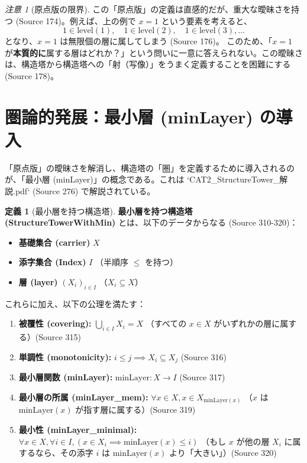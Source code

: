 \documentclass[11pt]{ltjsarticle}
\theoremstyle{definition}
\newtheorem{definition}{定義}[section]
\theoremstyle{plain}
\theoremstyle{remark}
\newtheorem{remark}{注意}[section]
\begin{document}
\begin{remark}[原点版の限界]
この「原点版」の定義は直感的だが、重大な曖昧さを持つ (Source 174)。例えば、上の例で $x = 1$ という要素を考えると、
$$ 1 \in \text{level}(1), \quad 1 \in \text{level}(2), \quad 1 \in \text{level}(3), \dots $$
となり、$x=1$ は無限個の層に属してしまう (Source 176)。
このため、「$x=1$ が\textbf{本質的に}属する層はどれか？」という問いに一意に答えられない。この曖昧さは、構造塔から構造塔への「射（写像）」をうまく定義することを困難にする (Source 178)。
\end{remark}

\section{圏論的発展：最小層 (minLayer) の導入}

「原点版」の曖昧さを解消し、構造塔の「圏」を定義するために導入されるのが、「最小層 (minLayer)」の概念である。これは `CAT2_StructureTower_解説.pdf` (Source 276) で解説されている。

\begin{definition}[最小層を持つ構造塔]
\textbf{最小層を持つ構造塔 (StructureTowerWithMin)} とは、以下のデータからなる (Source 310-320)：
\begin{itemize}
    \item \textbf{基礎集合 (carrier)} $X$
    \item \textbf{添字集合 (Index)} $I$ （半順序 $\le$ を持つ）
    \item \textbf{層 (layer)} $(X_i)_{i \in I}$ （$X_i \subseteq X$）
\end{itemize}
これらに加え、以下の公理を満たす：
\begin{enumerate}
    \item \textbf{被覆性 (covering):} $\bigcup_{i \in I} X_i = X$ （すべての $x \in X$ がいずれかの層に属する）(Source 315)
    \item \textbf{単調性 (monotonicity):} $i \le j \implies X_i \subseteq X_j$ (Source 316)
    \item \textbf{最小層関数 (minLayer):} $\text{minLayer} : X \to I$ (Source 317)
    \item \textbf{最小層の所属 (minLayer\_mem):} $\forall x \in X, x \in X_{\text{minLayer}(x)}$ （$x$ は $\text{minLayer}(x)$ が指す層に属する）(Source 319)
    \item \textbf{最小性 (minLayer\_minimal):} $\forall x \in X, \forall i \in I, (x \in X_i \implies \text{minLayer}(x) \le i)$ （もし $x$ が他の層 $X_i$ に属するなら、その添字 $i$ は $\text{minLayer}(x)$ より「大きい」）(Source 320)
\end{enumerate}
\end{definition}
\end{document}
